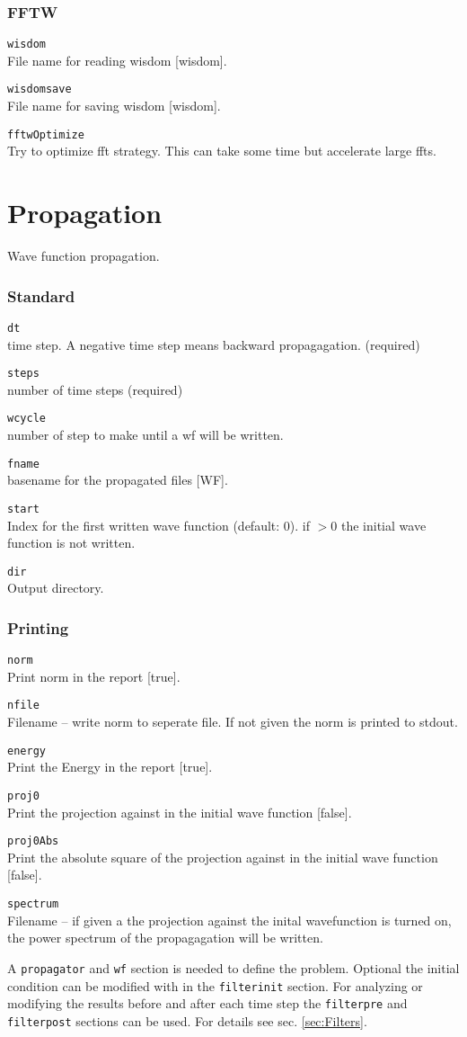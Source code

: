 \documentclass[a4paper,12pt]{scrbook}
\newcommand{\option}[2]{\item \texttt{#1}\\ #2}
\begin{document}
\subsubsection{FFTW}
\begin{options}
 \option{wisdom}{File name for reading wisdom [wisdom].}
 \option{wisdomsave}{File name for saving wisdom [wisdom].}
 \option{fftwOptimize}{Try to optimize fft strategy. This can take some time but accelerate large ffts.}
\end{options}


\section{Propagation}
Wave function propagation.
\subsubsection*{Standard}
\begin{options}
\option{dt}{time step. A negative time step means backward propagagation. (required)}
\option{steps}{number of time steps (required)}
\option{wcycle}{number of step to make until a wf will be written.}
\option{fname}{basename for the propagated files [WF].}
\option{start}{Index for the first written wave function (default: 0). if $>0$ the initial wave function is not written.}
\option{dir}{Output directory.}
\end{options}

\subsubsection*{Printing}
\begin{options}
\option{norm}{Print norm in the report [true].}
\option{nfile}{Filename -- write norm to seperate file. If not given the norm is printed to stdout.}
\option{energy}{Print the Energy in the report [true].}
\option{proj0}{Print the projection against in the initial wave function [false].}
\option{proj0Abs}{Print the absolute square of the projection against in the initial wave function [false].}
\option{spectrum}{Filename -- if given a the projection against the inital wavefunction is turned on, the power spectrum of the propagagation will be written.}
\end{options}

A \verb|propagator| and \verb|wf| section is needed to define the problem. Optional the initial condition can
be modified with in the \verb|filterinit| section. For analyzing or modifying the results before and after each time step
the \verb|filterpre| and \verb|filterpost| sections can be used. For details see sec. \ref{sec:Filters}.
\end{document}
